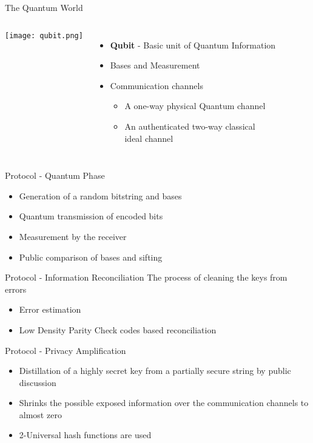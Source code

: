 \documentclass{beamer}
\begin{document}
\begin{frame}{The Quantum World}
     \begin{columns}
                \centering
                \texttt{[image: qubit.png]}
            \begin{itemize}[<+->]
                \item \textbf{Qubit} - Basic unit of Quantum Information
                \item Bases and Measurement
                \item Communication channels
                      \begin{itemize}
                            \item A one-way physical Quantum channel
                            \item An authenticated two-way classical \\ ideal channel
                      \end{itemize}
                \end{itemize}
    \end{columns}
\end{frame}


\begin{frame}{Protocol - Quantum Phase}
    \begin{itemize}[<+->]
        \item Generation of a random bitstring and bases 
		\item Quantum transmission of encoded bits
		\item Measurement by the receiver
		\item Public comparison of bases and sifting
	\end{itemize}
\end{frame}


\begin{frame}{Protocol - Information Reconciliation}
	The process of cleaning the keys from errors
	\begin{itemize}[<+->]
		\item Error estimation
		\item Low Density Parity Check codes based reconciliation
	\end{itemize}
\end{frame}


\begin{frame}{Protocol - Privacy Amplification}
	\begin{itemize}[<+->]
	    \item Distillation of a highly secret key from a partially secure string by public discussion
		\item Shrinks the possible exposed information over the communication channels to almost zero
		\item 2-Universal hash functions are used
	\end{itemize}
\end{frame}
\end{document}
